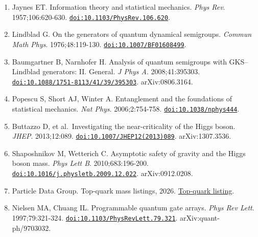 \documentclass[
  11pt,
  a4paper,
]{article}
\providecommand{\tightlist}{%
  \setlength{\itemsep}{0pt}\setlength{\parskip}{0pt}}
\begin{document}
\begin{enumerate}
\def\labelenumi{\arabic{enumi}.}
\tightlist
\item
  Jaynes ET. Information theory and statistical mechanics. \emph{Phys Rev}. 1957;106:620-630. \href{https://doi.org/10.1103/PhysRev.106.620}{\nolinkurl{doi:10.1103/PhysRev.106.620}}.
\item
  Lindblad G. On the generators of quantum dynamical semigroups. \emph{Commun Math Phys}. 1976;48:119-130. \href{https://doi.org/10.1007/BF01608499}{\nolinkurl{doi:10.1007/BF01608499}}.
\item
  Baumgartner B, Narnhofer H. Analysis of quantum semigroups with GKS--Lindblad generators: II. General. \emph{J Phys A}. 2008;41:395303. \href{https://doi.org/10.1088/1751-8113/41/39/395303}{\nolinkurl{doi:10.1088/1751-8113/41/39/395303}}. arXiv:0806.3164.
\item
  Popescu S, Short AJ, Winter A. Entanglement and the foundations of statistical mechanics. \emph{Nat Phys}. 2006;2:754-758. \href{https://doi.org/10.1038/nphys444}{\nolinkurl{doi:10.1038/nphys444}}.
\item
  Buttazzo D, et al.~Investigating the near-criticality of the Higgs boson. \emph{JHEP}. 2013;12:089. \href{https://doi.org/10.1007/JHEP12(2013)089}{\nolinkurl{doi:10.1007/JHEP12(2013)089}}. arXiv:1307.3536.
\item
  Shaposhnikov M, Wetterich C. Asymptotic safety of gravity and the Higgs boson mass. \emph{Phys Lett B}. 2010;683:196-200. \href{https://doi.org/10.1016/j.physletb.2009.12.022}{\nolinkurl{doi:10.1016/j.physletb.2009.12.022}}. arXiv:0912.0208.
\item
  Particle Data Group. Top-quark mass listings, 2026. \href{https://pdg.lbl.gov/2026/listings/rpp2026-list-t-quark.pdf}{Top-quark listing}.
\item
  Nielsen MA, Chuang IL. Programmable quantum gate arrays. \emph{Phys Rev Lett}. 1997;79:321-324. \href{https://doi.org/10.1103/PhysRevLett.79.321}{\nolinkurl{doi:10.1103/PhysRevLett.79.321}}. arXiv:quant-ph/9703032.
\end{enumerate}
\end{document}
